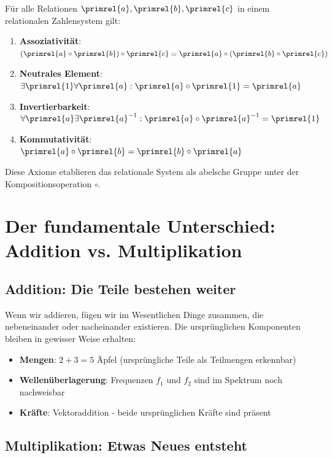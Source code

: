 	\begin{axiom}
		Für alle Relationen $\primrel{a}, \primrel{b}, \primrel{c}$ in einem relationalen Zahlensystem gilt:
		\begin{enumerate}
			\item \textbf{Assoziativität}: $(\primrel{a} \circ \primrel{b}) \circ \primrel{c} = \primrel{a} \circ (\primrel{b} \circ \primrel{c})$
			\item \textbf{Neutrales Element}: $\exists \primrel{1} \forall \primrel{a}: \primrel{a} \circ \primrel{1} = \primrel{a}$
			\item \textbf{Invertierbarkeit}: $\forall \primrel{a} \exists \primrel{a}^{-1}: \primrel{a} \circ \primrel{a}^{-1} = \primrel{1}$
			\item \textbf{Kommutativität}: $\primrel{a} \circ \primrel{b} = \primrel{b} \circ \primrel{a}$
		\end{enumerate}
	\end{axiom}
	
	Diese Axiome etablieren das relationale System als abelsche Gruppe unter der Kompositionsoperation $\circ$.
	
	\section{Der fundamentale Unterschied: Addition vs. Multiplikation}
	
	\subsection{Addition: Die Teile bestehen weiter}
	
	Wenn wir addieren, fügen wir im Wesentlichen Dinge zusammen, die nebeneinander oder nacheinander existieren. Die ursprünglichen Komponenten bleiben in gewisser Weise erhalten:
	
	\begin{itemize}
		\item \textbf{Mengen}: $2 + 3 = 5$ Äpfel (ursprüngliche Teile als Teilmengen erkennbar)
		\item \textbf{Wellenüberlagerung}: Frequenzen $f_1$ und $f_2$ sind im Spektrum noch nachweisbar
		\item \textbf{Kräfte}: Vektoraddition - beide ursprünglichen Kräfte sind präsent
	\end{itemize}
	
	\subsection{Multiplikation: Etwas Neues entsteht}
	
